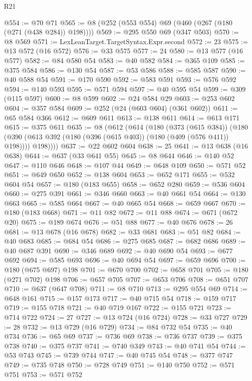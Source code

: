 \begin{lexlean}{R21}
\begin{coremodule}
@554 := @70 @71
@565 := @8 (@252 (@553 @554) @69 (@460 (@267 (@180 (@271 (@438 @284)) @198))))
@569 := @295 @550 @69 (@347 @503)
@570 := @8 @569
@571 := LexLeanTarget.TargetSyntax.Expr.second
@572 := 23
@575 := @13 @572 (@16 @572)
@576 := @33 @575
@577 := 24
@580 := @13 @577 (@16 @577)
@582 := @84 @580 @54
@583 := @40 @582
@584 := @365 @109
@585 := @375 @584
@586 := @130 @54
@587 := @53 @586
@588 := @585 @587
@590 := @40 @588 @54
@591 := @170 @590
@592 := @583 @591
@593 := @576 @592
@594 := @140 @593
@595 := @571 @594
@597 := @40 @595 @54
@599 := @309 (@115 @597)
@600 := @8 @599
@602 := @24 @584 @29
@603 := @253 @602
@604 := @357 @584
@609 := @252 (@24 (@603 @604) (@361 @602))
@611 := @65 @584 @366
@612 := @609 @611
@613 := @138 @611
@614 := @613 @171
@615 := @375 @611
@635 := @8
    (@612
      (@614
        (@180
          (@373 (@615 @384))
          (@180 (@390 (@613 @392 (@180 (@396 (@615 @403)) (@180 (@409 (@576 @411)) @198)))) @198))))
@637 := @22 @602 @604
@638 := 25
@641 := @13 @638 (@16 @638)
@644 := @637 (@33 @641 @55)
@645 := @8 @644
@646 := @140 @52
@647 := @110 @646
@648 := @107 @44
@649 := @648 @109
@650 := @571 @52
@651 := @649 @650
@652 := @138 @604
@653 := @652 @171
@655 := @532 @604 @54
@657 := @180 (@183 @655)
@658 := @652 @280
@659 := @536 @604
@660 := @275 @391
@661 := @346 @660
@663 := @40 @661 @54
@664 := @130 @663
@665 := @585 @664
@667 := @40 @665 @54
@668 := @659 @667
@670 := @180 (@183 @668)
@671 := @11 @82
@672 := @11 @88
@674 := @671 (@672 @20)
@675 := @189 @674
@676 := @51 @88
@677 := @40 @676
@678 := 26
@681 := @13 @678 (@16 @678)
@682 := @33 @681
@683 := @51 @82
@684 := @40 @683
@685 := @684 @54
@686 := @275 @685
@687 := @682 @686
@689 := @40 @687 @391
@690 := @346 @689
@692 := @40 @690 @54
@693 := @677 @692
@694 := @585 @693
@696 := @40 @694 @54
@697 := @659 @696
@700 := @180 (@675 @697) @198
@701 := @670 @700
@702 := @658 @701
@705 := @180 (@271 @702) @198
@706 := @657 @705
@707 := @653 @706
@708 := @651 @707
@710 := @637 (@647 @708)
@711 := @8 @710
@713 := @295 @554 @69
@714 := @648 @161
@715 := @157 @173
@717 := @40 @715 @54
@718 := @159 @717
@719 := @155 @718
@721 := @40 @719 @167
@722 := @155 @721
@723 := @714 @722
@724 := 27
@727 := @13 @724 (@16 @724)
@728 := @33 @727
@729 := 28
@732 := @13 @729 (@16 @729)
@734 := @84 @732 @54
@735 := @40 @734
@736 := @65 @69
@737 := @736 @69
@738 := @736 @737
@739 := @375 @738
@740 := @375 @737
@741 := @740 @349
@743 := @40 @741 @54
@744 := @53 @743
@745 := @739 @744
@747 := @40 @745 @54
@748 := @377 @747
@749 := @735 @748
@750 := @728 @749
@751 := @140 @750
@752 := @571 @751
@753 := @571 @752

\end{coremodule}
\end{lexlean}
